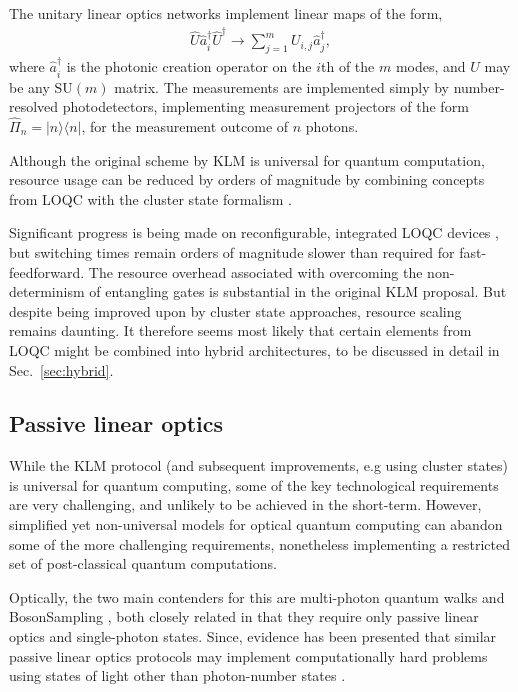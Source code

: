 \documentclass[aps,rmp,twocolumn,amsmath,amssymb,nofootinbib,superscriptaddress,longbibliography,floatfix]{revtex4-1}
\newcommand{\bra}[1]{\langle#1|}
\newcommand{\ket}[1]{|#1\rangle}
\begin{document}
The unitary linear optics networks implement linear maps of the form,
\begin{align}
\hat{U}\hat{a}_i^\dag \hat{U}^\dag \to \sum_{j=1}^m U_{i,j} \hat{a}^\dag_j,
\end{align}
where $\hat{a}^\dag_i$ is the photonic creation operator on the $i$th of the $m$ modes, and $U$ may be any $\mathrm{SU}(m)$ matrix. The measurements are implemented simply by number-resolved photodetectors, implementing measurement projectors of the form \mbox{$\hat\Pi_n=\ket{n}\bra{n}$}, for the measurement outcome of $n$ photons.

Although the original scheme by KLM is universal for quantum computation, resource usage can be reduced by orders of magnitude by combining concepts from LOQC with the cluster state formalism \cite{bib:Nielsen04, bib:BrowneRudolph05}.

Significant progress is being made on reconfigurable, integrated LOQC devices \cite{bib:UniversalLOOBrien}, but switching times remain orders of magnitude slower than required for fast-feedforward. The resource overhead associated with overcoming the non-determinism of entangling gates is substantial in the original KLM proposal. But despite being improved upon by cluster state approaches, resource scaling remains daunting. It therefore seems most likely that certain elements from LOQC might be combined into hybrid architectures, to be discussed in detail in Sec.~\ref{sec:hybrid}.

%
%

\subsection{Passive linear optics} \label{sec:BS}

While the KLM protocol (and subsequent improvements, e.g using cluster states) is universal for quantum computing, some of the key technological requirements are very challenging, and unlikely to be achieved in the short-term. However, simplified yet non-universal models for optical quantum computing can abandon some of the more challenging requirements, nonetheless implementing a restricted set of post-classical quantum computations.

Optically, the two main contenders for this are multi-photon quantum walks \cite{bib:Aharonov93, bib:Aharonov01, bib:Kempe03, bib:Salvador12, bib:RohdeMultiWalk11} and {\sc BosonSampling} \cite{bib:AaronsonArkhipov10, bib:RohdeIntroBS15}, both closely related in that they require only passive linear optics and single-photon states. Since, evidence has been presented that similar passive linear optics protocols may implement computationally hard problems using states of light other than photon-number states \cite{bib:RandBS, bib:RohdePhotAdd15, bib:RohdeDisp15, bib:RohdeCat15}.
\end{document}
